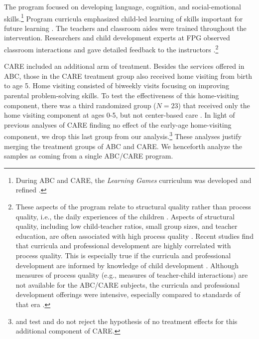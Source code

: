 The program focused on developing language, cognition, and social-emotional skills.\footnote{During ABC and CARE, the \textit{Learning Games} curriculum was developed and refined \citep{Sparling_Lewis_1979_BOOKLearninggamesFirstThree,Sparling_Lewis_1984_BOOKLearningGamesThreesFours}.} Program curricula emphasized child-led learning of skills important for future learning \citep{Ramey_Smith_1977_AJMD, Wasik_Ramey_etal_1990_CD, Ramey_Campbell_1991_childreninpoverty}. The teachers and classroom aides were trained throughout the intervention. Researchers and child development experts at FPG observed classroom interactions and gave detailed feedback to the instructors \citep{Ramey-etal_2012-ABC}.\footnote{These aspects of the program relate to structural quality rather than process quality, i.e., the daily experiences of the children \citep{Thomason_LaParo_2009_EED}. Aspects of structural quality, including low child-teacher ratios, small group sizes, and teacher education, are often associated with high process quality \citep{Phillipsen_etal_1997_ECRQ}. Recent studies find that curricula and professional development are highly correlated with process quality. This is especially true if the curricula and professional development are informed by knowledge of child development \citep{Slot_etal_2015_Dutch_ECRQ}. Although measures of process quality (e.g., measures of teacher-child interactions) are not available for the ABC/CARE subjects, the curricula and professional development offerings were intensive, especially compared to standards of that era \citep{Burchinal_etal_1989_CD_Daycare-Pre-K-Dev}.}

CARE included an additional arm of treatment. Besides the services offered in ABC, those in the CARE treatment group also received home visiting from birth to age 5. Home visiting consisted of biweekly visits focusing on improving parental problem-solving skills. To test the effectiveness of this home-visiting component, there was a third randomized group ($N=23$) that received only the home visiting component at ages 0-5, but not center-based care \citep{Wasik_Ramey_etal_1990_CD}. In light of previous analyses of CARE finding no effect of the early-age home-visiting component, we drop this last group from our analysis.\footnote{\citet{Campbell_Conti_etal_2014_EarlyChildhoodInvestments} and \citet{Burchinal_etal_2006_MSRCD_IV-Growth-Curve} test and do not reject the hypothesis of no treatment effects for this additional component of CARE.} These analyses justify merging the treatment groups of ABC and CARE. We henceforth analyze the samples as coming from a single ABC/CARE program.

